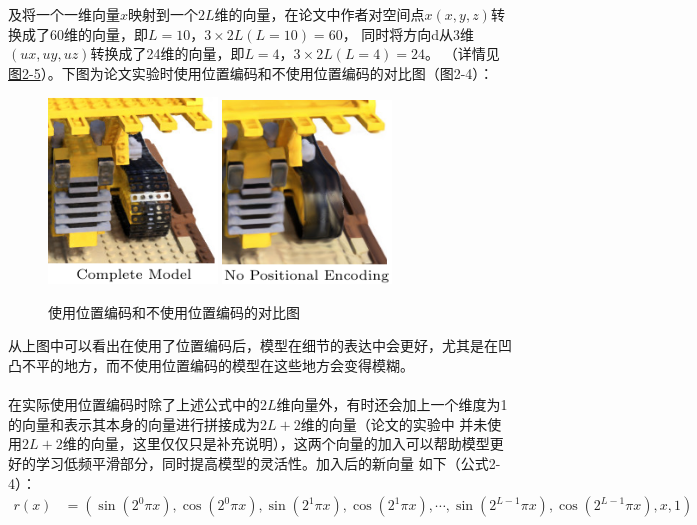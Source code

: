 \documentclass{nwputhesis}
\begin{document}
\indent
及将一个一维向量$x$映射到一个$2L$维的向量，在论文中作者对空间点$x(x,y,z)$转换成了60维的向量，即$L=10$，$3 \times 2L(L=10) = 60$，
同时将方向d从3维$(ux, uy, uz)$转换成了24维的向量，即$L=4$，$3 \times 2L(L=4) = 24$。
（详情见\hyperlink{图2-5}{图2-5}）。下图为论文实验时使用位置编码和不使用位置编码的对比图（图2-4）：
\begin{figure}[H]
    \centering
    \includegraphics[width=0.4\textwidth]{picture/6.png}
    \includegraphics[width=0.4\textwidth]{picture/7.png}
    \caption{使用位置编码和不使用位置编码的对比图}
\end{figure}
\indent
从上图中可以看出在使用了位置编码后，模型在细节的表达中会更好，尤其是在凹凸不平的地方，而不使用位置编码的模型在这些地方会变得模糊。\\
\\
\indent
在实际使用位置编码时除了上述公式中的$2L$维向量外，有时还会加上一个维度为1的向量和表示其本身的向量进行拼接成为$2L+2$维的向量（论文的实验中
并未使用$2L+2$维的向量，这里仅仅只是补充说明），这两个向量的加入可以帮助模型更好的学习低频平滑部分，同时提高模型的灵活性。加入后的新向量
如下（公式2-4）：
\begin{equation}
    \begin{aligned}
        r(x) &= (\sin(2^0\pi x), \cos(2^0\pi x), \sin(2^1\pi x), \cos(2^1\pi x), \cdots, \sin(2^{L-1}\pi x), \cos(2^{L-1}\pi x), x, 1)
    \end{aligned}
\end{equation}
\end{document}
